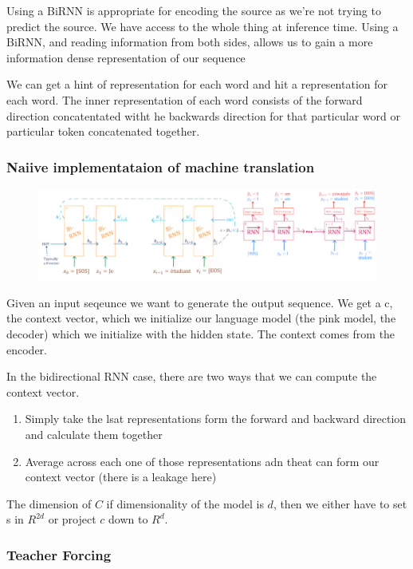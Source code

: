\documentclass[11pt]{article}
\begin{document}
Using a BiRNN is appropriate for encoding the source as we’re not trying to
predict the source. We have access to the whole thing at inference time. Using
a BiRNN, and reading information from both sides, allows us to gain a more
information dense representation of our sequence

We can get a hint of representation for each word and hit a representation for each word. The inner representation of each word consists of the forward direction concatentated witht he backwards direction for that particular word or particular token concatenated together.

\subsubsection{Naiive implementataion of machine translation}

\begin{figure}[H]
    \centering
    \includegraphics*[width=\linewidth]{figures/naiive-rnn.png}
\end{figure}

Given an input seqeunce we want to generate the output sequence. We get a c, the context vector, which we initialize our language model (the pink model, the decoder) which we initialize with the hidden state. The context comes from the encoder.

In the bidirectional RNN case, there are two ways that we can compute the context vector. 

\begin{enumerate}
    \item Simply take the lsat representations form the forward and backward direction and calculate them together
    \item Average across each one of those representations adn theat can form our context vector (there is a leakage here)
\end{enumerate}

The dimension of $C$ if dimensionality of the model is $d$, then we either have to set s in $R^{2d}$ or project $c$ down to $R^d$.

\subsubsection{Teacher Forcing}
\end{document}
